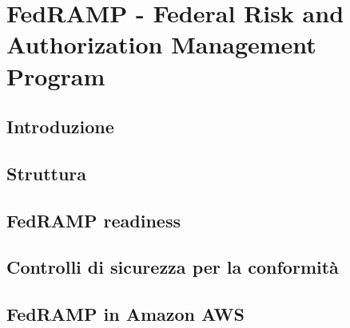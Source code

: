\documentclass[../main.tex]{subfiles}
\begin{document}
\chapter{FedRAMP - Federal Risk and Authorization Management Program}
\section{Introduzione}
\section{Struttura}
\section{FedRAMP readiness}
\section{Controlli di sicurezza per la conformità}
\section{FedRAMP in Amazon AWS}
\end{document}
